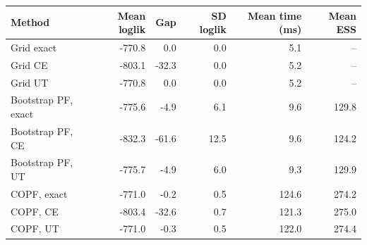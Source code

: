 \begin{tabular}{lrrrrr}
\toprule
Method & Mean loglik & Gap & SD loglik & Mean time (ms) & Mean ESS \\
\midrule
Grid exact & -770.8 & 0.0 & 0.0 & 5.1 & -- \\
Grid CE & -803.1 & -32.3 & 0.0 & 5.2 & -- \\
Grid UT & -770.8 & 0.0 & 0.0 & 5.2 & -- \\
Bootstrap PF, exact & -775.6 & -4.9 & 6.1 & 9.6 & 129.8 \\
Bootstrap PF, CE & -832.3 & -61.6 & 12.5 & 9.6 & 124.2 \\
Bootstrap PF, UT & -775.7 & -4.9 & 6.0 & 9.3 & 129.9 \\
COPF, exact & -771.0 & -0.2 & 0.5 & 124.6 & 274.2 \\
COPF, CE & -803.4 & -32.6 & 0.7 & 121.3 & 275.0 \\
COPF, UT & -771.0 & -0.3 & 0.5 & 122.0 & 274.4 \\
\bottomrule
\end{tabular}
